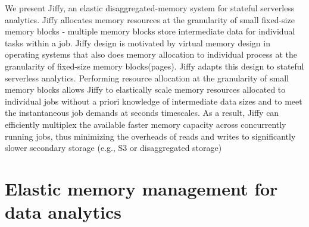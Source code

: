 We present Jiffy, an elastic disaggregated-memory system for stateful serverless analytics. Jiffy allocates memory resources at the granularity of small fixed-size memory blocks - multiple memory blocks store intermediate data for individual tasks within a job. Jiffy design is motivated by virtual memory design in operating systems that also does memory allocation to individual process at the granularity of fixed-size memory blocks(pages). Jiffy adapts this design to stateful serverless analytics. Performing resource allocation at the granularity of small memory blocks allows Jiffy to elastically scale memory resources allocated to individual jobs without a priori knowledge of intermediate data sizes and to meet the instantaneous job demands at seconds timescales. As a result, Jiffy can efficiently multiplex the available faster memory capacity across concurrently running jobs, thus minimizing the overheads of reads and writes to significantly slower secondary storage (e.g., S3 or disaggregated storage)

\section{Elastic memory management for data analytics}

